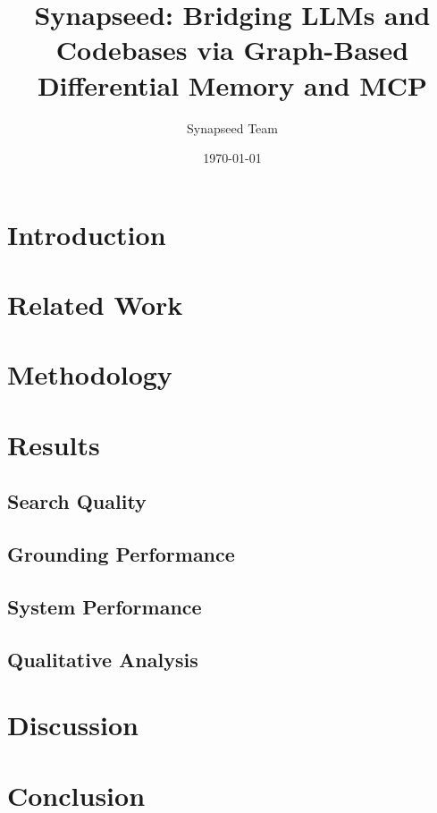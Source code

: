 \documentclass[twocolumn]{article}
\title{Synapseed: Bridging LLMs and Codebases via Graph-Based Differential Memory and MCP}
\author{Synapseed Team}
\date{\today}
\begin{document}
\maketitle



\section{Introduction}


\section{Related Work}


\section{Methodology}



\section{Results}
\label{sec:results}
\subsection{Search Quality}


\subsection{Grounding Performance}


\subsection{System Performance}



\subsection{Qualitative Analysis}


\section{Discussion}


\section{Conclusion}




\nocite{*}
\end{document}

